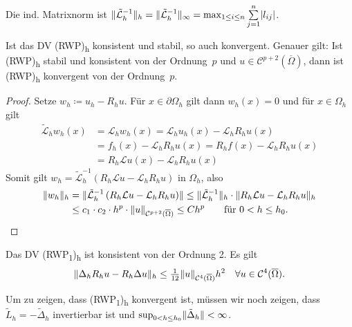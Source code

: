 \documentclass{cheat-sheet}
\newcommand{\Cont}{\mathcal{C}} %
\newcommand{\clos}[1]{\overline{#1}} %
\newcommand{\cOmega}{\clos{\Omega}} %
\newcommand{\LL}{\mathcal{L}} %
\newcommand{\Laplace}{\Delta}
\newcommand{\tss}[1]{\textsubscript{#1}} %
\begin{document}
\begin{bem}
  Die ind. Matrixnorm ist $\norm{\tilde{\LL}_h^{-1}}_h = \norm{\tilde{\LL}_h^{-1}}_\infty = \max_{1 \leq i \leq n} \sum_{j=1}^n \abs{l_{ij}}$.
\end{bem}


\begin{satz}
  Ist das DV (RWP)\tss{h} konsistent und stabil, so auch konvergent.
  Genauer gilt: Ist (RWP)\tss{h} stabil und konsistent von der Ordnung~$p$ und $u \in \Cont^{p+2}(\cOmega)$, dann ist (RWP)\tss{h} konvergent von der Ordnung~$p$.
\end{satz}


\begin{proof}
  Setze $w_h \coloneqq u_h - R_h u$.
  Für $x \in \partial \Omega_h$ gilt dann $w_h(x) = 0$ und für $x \in \Omega_h$ gilt
  \begin{align*}
    \tilde{\LL}_h w_h(x) &= \LL_h w_h(x) = \LL_h u_h(x) - \LL_h R_h u(x) \\
    &= f_h(x) - \LL_h R_h u(x) = R_h f(x) - \LL_h R_h u(x) \\
    &= R_h \LL u(x) - \LL_h R_h u(x)
  \end{align*}
  Somit gilt $w_h = \tilde{\LL}_h^{-1} \left( R_h \LL u - \LL_h R_h u \right)$ in $\Omega_h$, also
  \begin{align*}
    \norm{w_h}_h &= \norm{\tilde{\LL}_h^{-1} \left( R_h \LL u - \LL_h R_h u \right)}
    \leq \norm{\tilde{\LL}_h^{-1}}_h \cdot \norm{R_h \LL u - \LL_h R_h u}_h \\
    & \leq c_1 \cdot c_2 \cdot h^p \cdot \norm{u}_{\Cont^{p+2}(\cOmega)}
    \leq C h^p \qquad
    \text{für $0 < h \leq h_0$.} \qedhere
  \end{align*}
\end{proof}

\begin{lem}
  Das DV (RWP\tss{1})\tss{h} ist konsistent von der Ordnung 2.
  Es gilt
  \[
    \norm{\Laplace_h R_h u - R_h \Laplace u}_h \leq \tfrac{1}{12} \norm{u}_{\Cont^4(\cOmega)} h^2 \quad
    \forall u \in \Cont^4(\cOmega).
  \]
\end{lem}


\begin{bem}
  Um zu zeigen, dass (RWP\tss{1})\tss{h} konvergent ist, müssen wir noch zeigen, dass $\tilde{L}_h = - \tilde{\Laplace}_h$ invertierbar ist und $\sup_{0 < h \leq h_0} \norm{\tilde{\Laplace}_h} < \infty$.
\end{bem}
\end{document}
